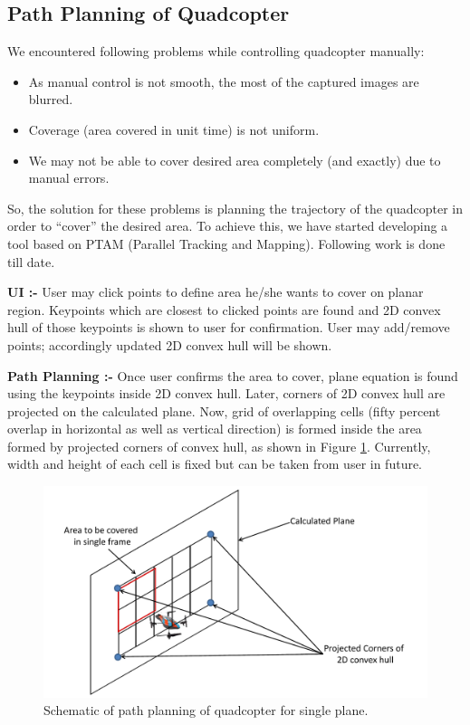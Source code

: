 \documentclass[11pt]{article}
\begin{document}
\subsection{Path Planning of Quadcopter}
\label{sec:furtherWork}
We encountered following problems while controlling quadcopter manually:
\begin{itemize}
  \item As manual control is not smooth, the most of the captured images are
  blurred.
  \item Coverage (area covered in unit time) is not uniform. 
  \item We may not be able to cover desired area completely (and exactly) due to
  manual errors.
\end{itemize}
So, the solution for these problems is planning the trajectory of the quadcopter
in order to ``cover'' the desired area. To achieve this, we have started
developing a tool based on PTAM (Parallel Tracking and Mapping).
Following work is done till date.

\textbf{UI :-} User may click points to define area he/she wants to cover on
planar region. Keypoints which are closest to clicked points are found and 2D convex
hull of those keypoints is shown to user for confirmation. User may add/remove
points; accordingly updated 2D convex hull will be shown.
		
\textbf{Path Planning :-} Once user confirms the area to cover, plane
equation is found using the keypoints inside 2D convex hull. Later, corners of
2D convex hull are projected on the calculated plane. Now, grid of overlapping
cells (fifty percent overlap in horizontal as well as vertical direction) is
formed inside the area formed by projected corners of convex hull, as shown in
Figure \ref{fig:pathPlanning}. Currently, width and height of each cell is fixed
but can be taken from user in future.

\begin{figure}[h!]
\centering
\includegraphics[width=\linewidth]{furtherWork/pathPlanning}
\caption{Schematic of path planning of quadcopter for single plane.}
\label{fig:pathPlanning}
\end{figure}
\end{document}

